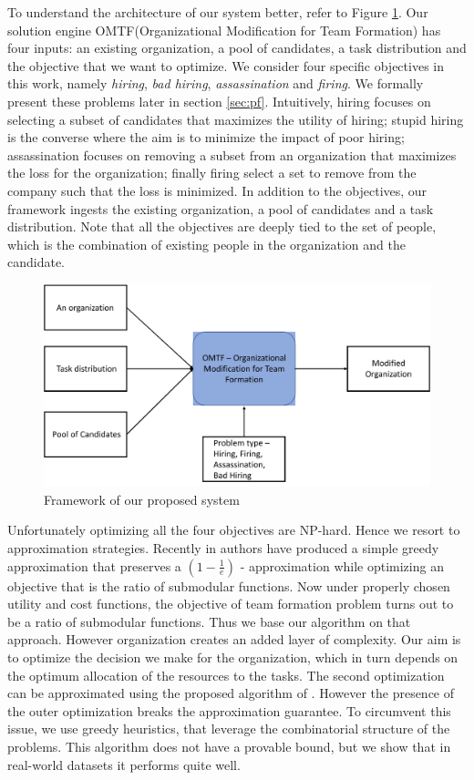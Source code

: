 To understand the architecture of our system better, refer to Figure \ref{fig:hpo}. Our solution engine OMTF(Organizational Modification for Team Formation) has four inputs: an existing organization, a pool of candidates, a task distribution and the objective that we want to optimize. We consider four specific objectives in this work, namely \textit{hiring}, \textit{bad hiring}, \textit{assassination} and \textit{firing}. We formally present these problems later in section \ref{sec:pf}. Intuitively, hiring focuses on selecting a subset of candidates that maximizes the utility of hiring; stupid hiring is the converse where the aim is to minimize the impact of poor hiring; assassination focuses on removing a subset from an organization that maximizes the loss for the organization; finally firing select a set to remove from the company such that the loss is minimized. In addition to the objectives, our framework ingests the existing organization, a pool of candidates and a task distribution. Note that all the objectives are deeply tied to the set of people, which is the combination of existing people in the organization and the candidate.
\begin{figure}[h]
\centering
\begin{small}
\includegraphics[width=1.0\textwidth]{figs/illustration.pdf}
\caption{Framework of our proposed system}
\label{fig:hpo}
\end{small}
\end{figure} 

Unfortunately optimizing all the four objectives are NP-hard. Hence we resort to approximation strategies. Recently in \cite{bai2016algorithms} authors have produced a simple greedy approximation that preserves a $(1 - \frac{1}{e})$ - approximation while optimizing an objective that is the ratio of submodular functions. Now under properly chosen utility and cost functions, the objective of team formation problem turns out to be a ratio of submodular functions. Thus we base our algorithm on that approach. However organization creates an added layer of complexity. Our aim is to optimize the decision we make for the organization, which in turn depends on the optimum allocation of the resources to the tasks. The second optimization can be approximated using the proposed algorithm of \cite{bai2016algorithms}. However the presence of the outer optimization breaks the approximation guarantee. To circumvent this issue, we use greedy heuristics, that leverage the combinatorial structure of the problems. This algorithm does not have a provable bound, but we show that in real-world datasets it performs quite well.

